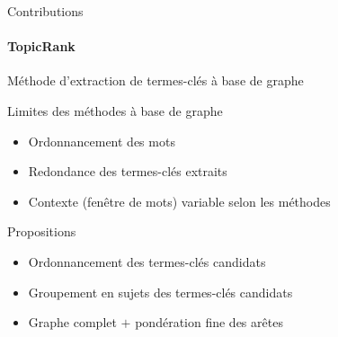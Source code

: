\begin{frame}{Contributions}\framesubtitle{TopicRank}
  Méthode d'extraction de termes-clés à base de graphe

  \vspace{1em}

  \begin{alertblock}{Limites des méthodes à base de graphe}
    \begin{itemize}
      \item{Ordonnancement des mots}
      \item{Redondance des termes-clés extraits}
      \item{Contexte (fenêtre de mots) variable selon les méthodes}
    \end{itemize}
  \end{alertblock}

  \vspace{1em}

  \begin{block}{Propositions}
    \begin{itemize}
      \item{Ordonnancement des termes-clés candidats}
      \item{Groupement en sujets des termes-clés candidats}
      \item{Graphe complet $+$ pondération fine des arêtes}
    \end{itemize}
  \end{block}
\end{frame}



